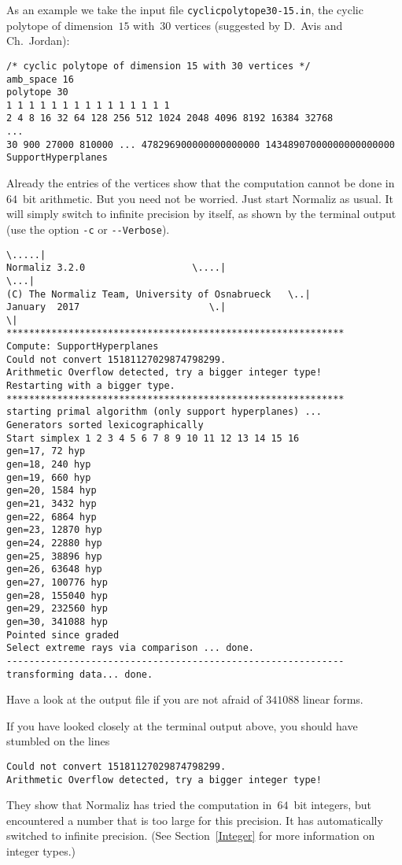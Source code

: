 \documentclass[12pt,a4paper]{scrartcl}
\theoremstyle{definition}
\begin{document}
As an example we take the input file \verb|cyclicpolytope30-15.in|, the cyclic polytope of dimension~$15$ with~$30$ vertices (suggested by D.~Avis and Ch.~Jordan):
\begin{Verbatim}
/* cyclic polytope of dimension 15 with 30 vertices */
amb_space 16
polytope 30
1 1 1 1 1 1 1 1 1 1 1 1 1 1 1
2 4 8 16 32 64 128 256 512 1024 2048 4096 8192 16384 32768
...
30 900 27000 810000 ... 478296900000000000000 14348907000000000000000
SupportHyperplanes
\end{Verbatim}
Already the entries of the vertices show that the computation cannot be done in~$64$~bit arithmetic. But you need not be worried. Just start Normaliz as usual. It will simply switch to infinite precision by itself, as shown by the terminal output (use the option \verb|-c| or \verb|--Verbose|).
\begin{Verbatim}
\.....|
Normaliz 3.2.0                   \....|
\...|
(C) The Normaliz Team, University of Osnabrueck   \..|
January  2017                       \.|
\|
************************************************************
Compute: SupportHyperplanes
Could not convert 15181127029874798299.
Arithmetic Overflow detected, try a bigger integer type!
Restarting with a bigger type.
************************************************************
starting primal algorithm (only support hyperplanes) ...
Generators sorted lexicographically
Start simplex 1 2 3 4 5 6 7 8 9 10 11 12 13 14 15 16 
gen=17, 72 hyp
gen=18, 240 hyp
gen=19, 660 hyp
gen=20, 1584 hyp
gen=21, 3432 hyp
gen=22, 6864 hyp
gen=23, 12870 hyp
gen=24, 22880 hyp
gen=25, 38896 hyp
gen=26, 63648 hyp
gen=27, 100776 hyp
gen=28, 155040 hyp
gen=29, 232560 hyp
gen=30, 341088 hyp
Pointed since graded
Select extreme rays via comparison ... done.
------------------------------------------------------------
transforming data... done.
\end{Verbatim}
Have a look at the output file if you are not afraid of $341088$ linear forms.

If you have looked closely at the terminal output above, you should have stumbled on the lines
\begin{Verbatim}
Could not convert 15181127029874798299.
Arithmetic Overflow detected, try a bigger integer type!
\end{Verbatim}
They show that Normaliz has tried the computation in~$64$~bit integers, but encountered a number that is too large for this precision. It has automatically switched to infinite precision. (See Section~\ref{Integer} for more information on integer types.)
\end{document}
